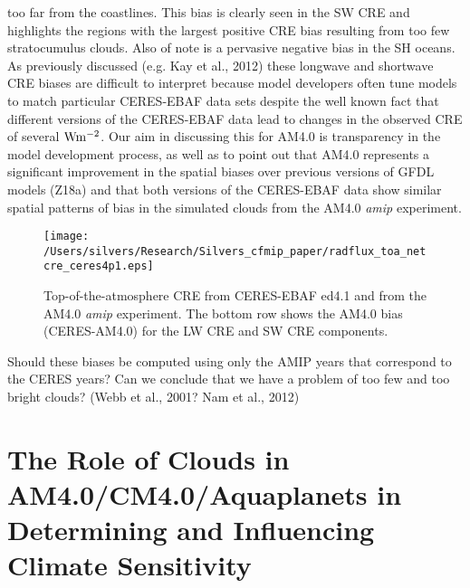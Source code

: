 \documentclass[draft]{agujournal2019}
\begin{document}
too far from the coastlines. 
This bias is clearly seen in the SW CRE and highlights the regions with the largest
positive CRE bias resulting from too few stratocumulus clouds.  Also of note is a pervasive negative bias in the SH oceans.   
  As previously discussed (e.g. Kay et al., 2012) these longwave and shortwave CRE 
biases are difficult to interpret because model developers often tune models to match particular CERES-EBAF data 
sets despite the well known fact that different versions of the CERES-EBAF data lead to changes in the observed CRE of
several $\rm{W m^{-2}}$.   Our aim in discussing this for AM4.0 is transparency in the model development process, 
as well as to point out that AM4.0 represents a significant improvement in the spatial biases over previous versions
of GFDL models (Z18a) and that both versions of the CERES-EBAF data show similar spatial patterns of bias in the 
simulated clouds  from the AM4.0 \textit{amip} experiment.   

\begin{figure}
  \centering
  \texttt{[image: /Users/silvers/Research/Silvers\_cfmip\_paper/radflux\_toa\_netcre\_ceres4p1.eps]}
  \caption{Top-of-the-atmosphere CRE from CERES-EBAF ed4.1 and from the AM4.0 \textit{amip} experiment.  
  The bottom row shows the AM4.0 bias (CERES-AM4.0) for the LW CRE and SW CRE components.}
  \label{fig:ceres_cre_4p1}
\end{figure}

Should these biases be computed using only the AMIP years that 
correspond to the CERES years? 
Can we conclude that we have a problem of too few and too bright clouds?   (Webb et al., 2001? Nam et al., 2012)



\section{The Role of Clouds in AM4.0/CM4.0/Aquaplanets in Determining and Influencing Climate Sensitivity}

\end{document}
